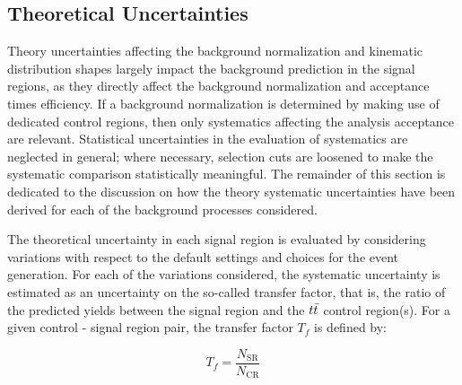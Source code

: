 
\subsection{Theoretical Uncertainties}
\label{sec:TheoSystematics}

Theory uncertainties affecting the background normalization and kinematic distribution shapes largely impact the background prediction in the signal regions, as they directly affect the background normalization and acceptance times efficiency. If a background normalization is determined by making use of dedicated control regions, then only systematics affecting the analysis acceptance are relevant. Statistical uncertainties in the evaluation of systematics are neglected in general; where necessary, selection cuts are loosened to make the systematic comparison statistically meaningful. The remainder of this section is dedicated to the discussion on how the theory systematic uncertainties have been derived for each of the background processes considered.

The theoretical uncertainty in each signal region is evaluated by
considering variations with respect to the default settings and choices for the event generation. For each of the variations considered, the systematic uncertainty is estimated as an uncertainty on the so-called transfer factor, that is, the ratio of the predicted yields between the signal region and the $t\bar{t}$ control region(s). For a given control - signal region pair, the transfer factor $T_f$ is defined by:

\begin{equation}
  T_f = \frac{N_{\mathrm{SR}}}{N_{\mathrm{CR}}}
\end{equation}

